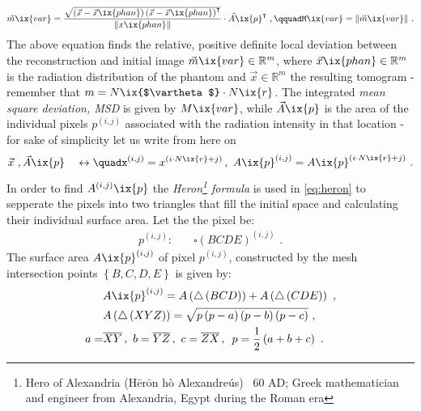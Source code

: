         \begin{align}%
            \vec{m}\ix{var}=\frac{\sqrt{\left(\vec{x}-\vec{x}\ix{phan}\right)\left(\vec{x}-\vec{x}\ix{phan}\right)^{\intercal}}}{\|x\ix{phan}\|}\cdot\vec{A}\ix{p}^{\intercal}\,\,,\qquad%
            M\ix{var}=\|\vec{m}\ix{var}\|\,\,.%
            \label{eq:msd}%
        \end{align}%
%
        The above equation finds the relative, positive definite local deviation between the reconstruction and initial image $\vec{m}\ix{var}\in\mathbb{R}^{m}$, where $\vec{x}\ix{phan}\in\mathbb{R}^{m}$ is the radiation distribution of the phantom and $\vec{x}\in\mathbb{R}^{m}$ the resulting tomogram - remember that $m=N\ix{$\vartheta$}\cdot N\ix{r}$. The integrated \textit{mean square deviation, MSD} is given by $M\ix{var}$, while $\vec{A}\ix{p}$ is the area of the individual pixels $p^{\left(i,j\right)}$ associated with the radiation intensity in that location - for sake of simplicity let us write from here on%
%
        \begin{align}%
            \vec{x}\,\,,\vec{A}\ix{p}\quad\leftrightarrow\quad%
            x^{\left(i,j\right)}=x^{\left(i\cdot N\ix{r}+j\right)}\,,\,\,%
            A\ix{p}^{\left(i,j\right)}=A\ix{p}^{\left(i\cdot N\ix{r}+j\right)}%
            \,\,.\nonumber%
        \end{align}%
%
        In order to find $A^{\left(i,j\right)}\ix{p}$ the \textit{Heron\footnote[1]{Hero of Alexandria (Hērōn hò Alexandreús) \textdagger~60 AD; Greek mathematician and engineer from Alexandria, Egypt during the Roman era} formula} is used in \cref{eq:heron} to sepperate the pixels into two triangles that fill the initial space and calculating their individual surface area. Let the the pixel be:
%
        \begin{align}%
            p^{\left(i,j\right)}:&\quad\square\left(BCDE\right)^{\left(i,j\right)}\,\,.\nonumber%
        \end{align}%
%
        The surface area $A\ix{p}^{\left(i,j\right)}$ of pixel $p^{\left(i,j\right)}$, constructed by the mesh intersection points $\left\{B,C,D,E\right\}$ is given by:
%
        \begin{align}%
            \begin{split}%
                &A\ix{p}^{\left(i,j\right)}=A\left(\bigtriangleup\left(BCD\right)\right)+A\left(\bigtriangleup\left(CDE\right)\right)\,\,,\\%
                &A\left(\bigtriangleup\left(XYZ\right)\right)=\sqrt{p\left(p-a\right)\left(p-b\right)\left(p-c\right)}\,\,,\\%
                a=&\overline{XY}\,,\,\,b=\overline{YZ}\,,\,\,c=\overline{ZX}\,,\,\,\,p=\frac{1}{2}\left(a+b+c\right)\,\,.%
            \end{split}\label{eq:heron}%
        \end{align}%
